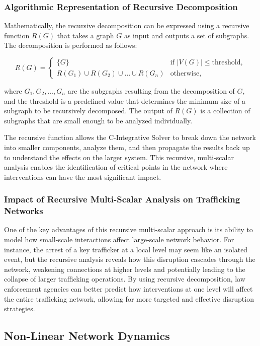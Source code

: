 \documentclass[%
 preprint, linenumbers,
 amsmath,amssymb,
 aps, physrev,
]{revtex4-2}
\begin{document}
\subsubsection{Algorithmic Representation of Recursive Decomposition}

Mathematically, the recursive decomposition can be expressed using a recursive function \( R(G) \) that takes a graph \( G \) as input and outputs a set of subgraphs. The decomposition is performed as follows:

\[
R(G) = \begin{cases} 
    \{ G \} & \text{if } |V(G)| \leq \text{threshold}, \\
    R(G_1) \cup R(G_2) \cup \dots \cup R(G_n) & \text{otherwise}, 
\end{cases}
\]

where \( G_1, G_2, \dots, G_n \) are the subgraphs resulting from the decomposition of \( G \), and the threshold is a predefined value that determines the minimum size of a subgraph to be recursively decomposed. The output of \( R(G) \) is a collection of subgraphs that are small enough to be analyzed individually.

The recursive function allows the C-Integrative Solver to break down the network into smaller components, analyze them, and then propagate the results back up to understand the effects on the larger system. This recursive, multi-scalar analysis enables the identification of critical points in the network where interventions can have the most significant impact.

\subsubsection{Impact of Recursive Multi-Scalar Analysis on Trafficking Networks}

One of the key advantages of this recursive multi-scalar approach is its ability to model how small-scale interactions affect large-scale network behavior. For instance, the arrest of a key trafficker at a local level may seem like an isolated event, but the recursive analysis reveals how this disruption cascades through the network, weakening connections at higher levels and potentially leading to the collapse of larger trafficking operations. By using recursive decomposition, law enforcement agencies can better predict how interventions at one level will affect the entire trafficking network, allowing for more targeted and effective disruption strategies.
\subsection{Non-Linear Network Dynamics}
\end{document}

